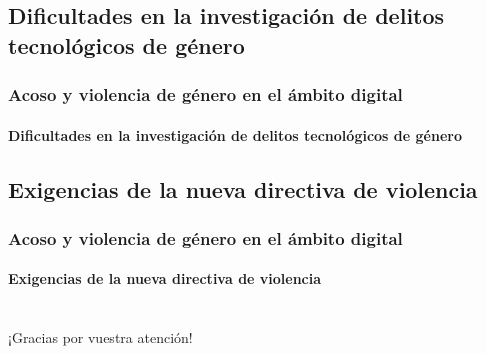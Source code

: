 \documentclass{beamer}
\begin{document}
    \subsection{Dificultades en la investigación de delitos tecnológicos de género}
    \begin{frame}
		\frametitle{Acoso y violencia de género en el ámbito digital}
        \framesubtitle{Dificultades en la investigación de delitos tecnológicos de género}
	\end{frame}

    \subsection{Exigencias de la nueva directiva de violencia}
    \begin{frame}
		\frametitle{Acoso y violencia de género en el ámbito digital}
        \framesubtitle{Exigencias de la nueva directiva de violencia}
	\end{frame}

    \section{}
    \subsection{}

	\begin{frame}
        \begin{block}{}
			\centering
			¡Gracias por vuestra atención!
		\end{block}
	\end{frame}
\end{document}

